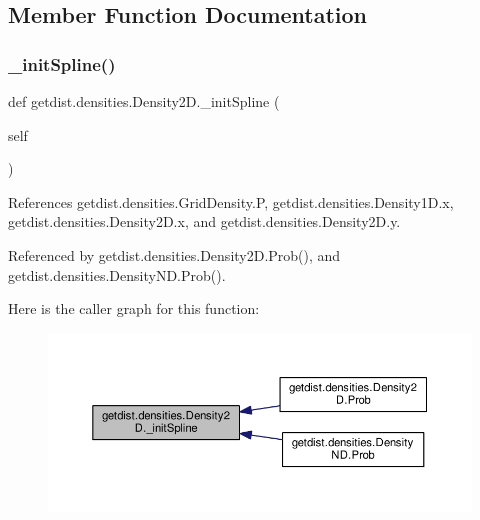 \subsection{Member Function Documentation}
\mbox{\label{classgetdist_1_1densities_1_1Density2D_abe44d1daf83c674e7b584acb50acdc58}} 
\subsubsection{\texorpdfstring{\+\_\+init\+Spline()}{\_initSpline()}}
{\footnotesize\ttfamily def getdist.\+densities.\+Density2\+D.\+\_\+init\+Spline (\begin{DoxyParamCaption}\item[{}]{self }\end{DoxyParamCaption})\hspace{0.3cm}{\ttfamily [private]}}



References getdist.\+densities.\+Grid\+Density.\+P, getdist.\+densities.\+Density1\+D.\+x, getdist.\+densities.\+Density2\+D.\+x, and getdist.\+densities.\+Density2\+D.\+y.



Referenced by getdist.\+densities.\+Density2\+D.\+Prob(), and getdist.\+densities.\+Density\+N\+D.\+Prob().

Here is the caller graph for this function\+:
\nopagebreak
\begin{figure}[H]
\begin{center}
\leavevmode
\includegraphics[width=350pt]{classgetdist_1_1densities_1_1Density2D_abe44d1daf83c674e7b584acb50acdc58_icgraph}
\end{center}
\end{figure}
\mbox{\label{classgetdist_1_1densities_1_1Density2D_a1867261071c004cd1b4b438a627a0264}} 
